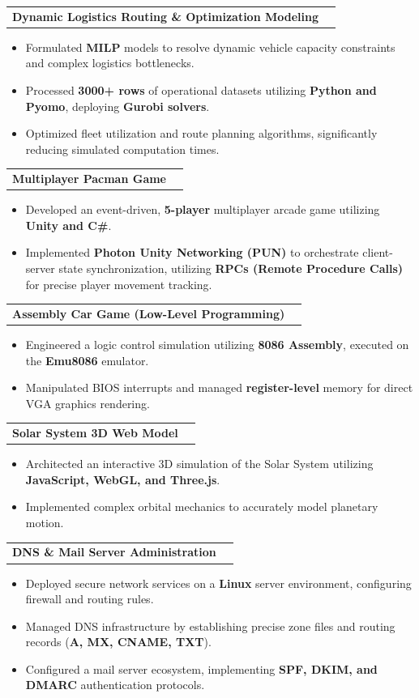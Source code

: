 \documentclass[letterpaper,11pt]{article}
\newcommand{\resumeItem}[1]{
  \item\small{
    {#1 \vspace{-4pt}}
  }
}
\newcommand{\resumeProjectHeading}[2]{
    \item
    \begin{tabularx}{0.97\textwidth}{X r}
      \textbf{#1} & #2 \\
    \end{tabularx}\vspace{-5pt}
}
\newcommand{\resumeItemListStart}{\begin{itemize}}
\newcommand{\resumeItemListEnd}{\end{itemize}\vspace{-5pt}}
\begin{document}
      \resumeProjectHeading
          {\textbf{Dynamic Logistics Routing \& Optimization Modeling} }{}
          \resumeItemListStart
            \resumeItem{Formulated \textbf{MILP} models to resolve dynamic vehicle capacity constraints and complex logistics bottlenecks.}
            \resumeItem{Processed \textbf{3000+ rows} of operational datasets utilizing \textbf{Python and Pyomo}, deploying \textbf{Gurobi solvers}.}
            \resumeItem{Optimized fleet utilization and route planning algorithms, significantly reducing simulated computation times.}
          \resumeItemListEnd

      \resumeProjectHeading
          {\textbf{Multiplayer Pacman Game } }{}
          \resumeItemListStart
            \resumeItem{Developed an event-driven, \textbf{5-player} multiplayer arcade game utilizing \textbf{Unity and C\#}.}
            \resumeItem{Implemented \textbf{Photon Unity Networking (PUN)} to orchestrate client-server state synchronization, utilizing \textbf{RPCs (Remote Procedure Calls)} for precise player movement tracking.}
          \resumeItemListEnd

      \resumeProjectHeading
          {\textbf{Assembly Car Game (Low-Level Programming)} }{}
          \resumeItemListStart
            \resumeItem{Engineered a logic control simulation utilizing \textbf{8086 Assembly}, executed on the \textbf{Emu8086} emulator.}
            \resumeItem{Manipulated BIOS interrupts and managed \textbf{register-level} memory for direct VGA graphics rendering.}
          \resumeItemListEnd

      \resumeProjectHeading
          {\textbf{Solar System 3D Web Model} }{}
          \resumeItemListStart
            \resumeItem{Architected an interactive 3D simulation of the Solar System utilizing \textbf{JavaScript, WebGL, and Three.js}.}
            \resumeItem{Implemented complex orbital mechanics to accurately model planetary motion.}
          \resumeItemListEnd

      \resumeProjectHeading
          {\textbf{DNS \& Mail Server Administration} }{}
          \resumeItemListStart
            \resumeItem{Deployed secure network services on a \textbf{Linux} server environment, configuring firewall and routing rules.}
            \resumeItem{Managed DNS infrastructure by establishing precise zone files and routing records (\textbf{A, MX, CNAME, TXT}).}
            \resumeItem{Configured a mail server ecosystem, implementing \textbf{SPF, DKIM, and DMARC} authentication protocols.}
          \resumeItemListEnd
\end{document}
